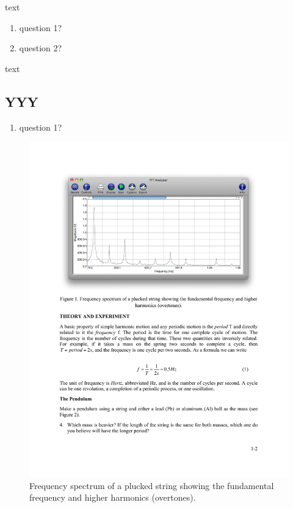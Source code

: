 \documentclass[11pt]{NSF}
\def\ben{\begin{enumerate}}
\def\een{\end{enumerate}}
\begin{document}
text

\ben
\item
question 1?

\item
question 2?
\een

text

\subsection{YYY}

\ben
\item
question 1?

\een

%
\begin{figure}[hbtp]
\begin{center}
\includegraphics[width=.95\textwidth]{fig1_1}
\caption{Frequency spectrum of a plucked string showing the 
fundamental frequency and higher harmonics (overtones).}
\label{f:1}
\end{center}
\end{figure}
%
%
\end{document}
